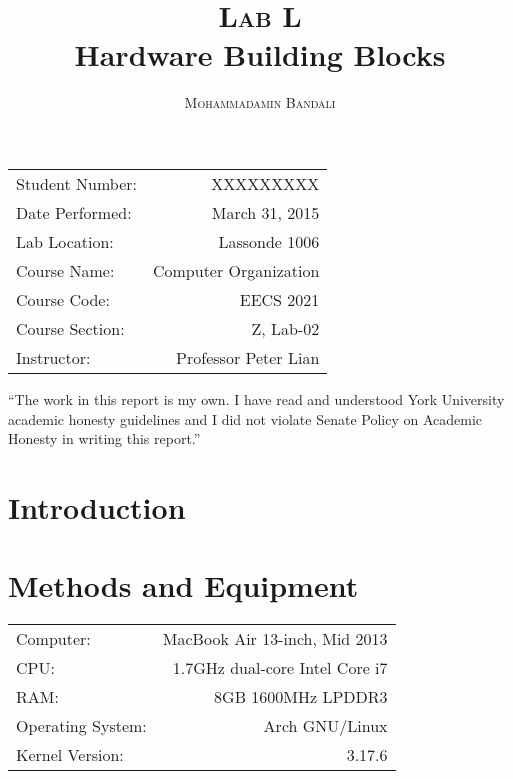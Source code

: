 \documentclass{article}
\title{\textsc{Lab L} \\ Hardware Building Blocks } %
\author{\textsc{Mohammadamin Bandali}} %
\date{} %
\newenvironment{statement}{\par\vspace{50ex}}{\clearpage}
\begin{document}
\maketitle %

\begin{center}
\begin{tabular}{l r}
Student Number: & XXXXXXXXX \\ 
Date Performed: & March 31, 2015 \\ %
Lab Location: & Lassonde 1006 \\ 
Course Name: & Computer Organization \\ 
Course Code: & EECS 2021 \\ 
Course Section: & Z, Lab-02\\ 
Instructor: & Professor Peter Lian %
\end{tabular}
\end{center}

\begin{statement}
“The work in this report is my own. I have read and understood York University
academic honesty guidelines and I did not violate Senate Policy on Academic
Honesty in writing this report.”
\end{statement}


\section{Introduction}



\section{Methods and Equipment}

\begin{center}
\begin{tabular}{l r}
Computer: & MacBook Air 13-inch, Mid 2013 \\
CPU: & 1.7GHz dual-core Intel Core i7 \\
RAM: & 8GB 1600MHz LPDDR3 \\
Operating System: & Arch GNU/Linux \\
Kernel Version: & 3.17.6
\end{tabular}
\end{center}
\end{document}
